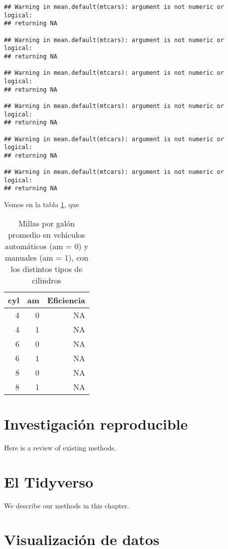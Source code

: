 \documentclass[]{book}
\begin{document}
\begin{verbatim}
## Warning in mean.default(mtcars): argument is not numeric or logical:
## returning NA

## Warning in mean.default(mtcars): argument is not numeric or logical:
## returning NA

## Warning in mean.default(mtcars): argument is not numeric or logical:
## returning NA

## Warning in mean.default(mtcars): argument is not numeric or logical:
## returning NA

## Warning in mean.default(mtcars): argument is not numeric or logical:
## returning NA

## Warning in mean.default(mtcars): argument is not numeric or logical:
## returning NA
\end{verbatim}

Vemos en la tabla \ref{tab:Eficienciatab}, que

\begin{table}

\caption{\label{tab:Eficienciatab}Millas por galón promedio en vehiculos automáticos (am = 0) y manuales (am = 1), con los distintos tipos de cilindros}
\centering
\begin{tabular}[t]{rrr}
\toprule
cyl & am & Eficiencia\\
\midrule
4 & 0 & NA\\
4 & 1 & NA\\
6 & 0 & NA\\
6 & 1 & NA\\
8 & 0 & NA\\
8 & 1 & NA\\
\bottomrule
\end{tabular}
\end{table}

\hypertarget{reproducible}{%
\chapter{Investigación reproducible}\label{reproducible}}

Here is a review of existing methods.

\hypertarget{tidyverso}{%
\chapter{El Tidyverso}\label{tidyverso}}

We describe our methods in this chapter.

\hypertarget{visualizacion}{%
\chapter{Visualización de datos}\label{visualizacion}}
\end{document}
